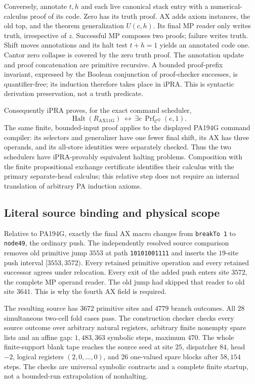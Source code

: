 Conversely, annotate $t,h$ and each live canonical stack entry with a
numerical-calculus proof of its code. Zero has its truth proof. AX adds
axiom instances, the old top, and the theorem generalization $U(c,h)$.
Its final MP reader only writes truth, irrespective of $z$. Successful
MP composes two proofs; failure writes truth. Shift moves annotations
and its halt test $t+h=1$ yields an annotated code one. Cantor zero
collapse is covered by the zero truth proof. The annotation update and
proof concatenation are primitive recursive. A bounded proof-prefix
invariant, expressed by the Boolean conjunction of proof-checker
successes, is quantifier-free; its induction therefore takes place in
iPRA. This is syntactic derivation preservation, not a truth predicate.

Consequently iPRA proves, for the exact command scheduler,
\[
 \operatorname{Halt}(R_{\mathrm{AX11G}})
 \ \longleftrightarrow\
 \exists e\,\operatorname{Prf}_{\mathcal C^Q}(e,1).
\]
The same finite, bounded-input proof applies to the displayed PA194G
command compiler: its selectors and generalizer have one fewer final
shift, its AX has three operands, and its all-store identities were
separately checked. Thus the two schedulers have iPRA-provably equivalent
halting problems. Composition with the finite propositional exchange
certificate identifies their calculus with the primary separate-head
calculus; this relative step does not require an internal translation of
arbitrary PA induction axioms.

\subsection{Literal source binding and physical scope}

Relative to PA194G, exactly the final AX macro changes from
\texttt{breakTo 1} to \texttt{node49}, the ordinary push. The independently
resolved source comparison removes old primitive jump $3553$ at path
\texttt{10101001111} and inserts the $19$-site push interval
$[3553,3572)$. Every retained primitive operation and every retained
successor agrees under relocation. Every exit of the added push enters
site $3572$, the complete MP operand reader. The old jump had skipped
that reader to old site $3641$. This is why the fourth AX field is required.

The resulting source has $3672$ primitive sites and $4779$ branch outcomes.
All $28$ simultaneous two-cell fold cases pass. The construction checker
checks every source outcome over arbitrary natural registers, arbitrary
finite nonempty spare lists and an affine gap: $1,483,363$ symbolic steps,
maximum $470$. The whole finite-support blank tape reaches the source
seed at site $25$, dispatcher $84$, head $-2$, logical registers
$(2,0,\ldots,0)$, and $26$ one-valued spare blocks after $58,154$ steps.
The checks are universal symbolic contracts and a complete finite startup,
not a bounded-run extrapolation of nonhalting.

